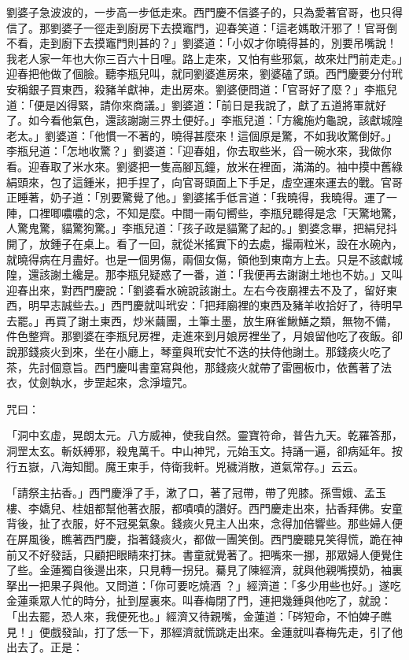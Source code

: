 \begin{showcontents}{}
劉婆子急波波的，一步高一步低走來。西門慶不信婆子的，只為愛著官哥，也只得信了。那劉婆子一徑走到廚房下去摸竈門，迎春笑道：「這老媽敢汗邪了！官哥倒不看，走到廚下去摸竈門則甚的？」劉婆道：「小奴才你曉得甚的，別要吊嘴說！我老人家一年也大你三百六十日哩。路上走來，又怕有些邪氣，故來灶門前走走。」迎春把他做了個臉。聽李瓶兒叫，就同劉婆進房來，劉婆磕了頭。西門慶要分付玳安稱銀子買東西，殺豬羊獻神，走出房來。劉婆便問道：「官哥好了麼？」李瓶兒道：「便是凶得緊，請你來商議。」劉婆道：「前日是我說了，獻了五道將軍就好了。如今看他氣色，還該謝謝三界土便好。」李瓶兒道：「方纔施灼龜說，該獻城隍老太。」劉婆道：「他慣一不著的，曉得甚麼來！這個原是驚，不如我收驚倒好。」李瓶兒道：「怎地收驚？」劉婆道：「迎春姐，你去取些米，舀一碗水來，我做你看。迎春取了米水來。劉婆把一隻高腳瓦鐘，放米在裡面，滿滿的。袖中摸中舊綠絹頭來，包了這鍾米，把手捏了，向官哥頭面上下手足，虛空運來運去的戰。官哥正睡著，奶子道：「別要驚覺了他。」劉婆搖手低言道：「我曉得，我曉得。運了一陣，口裡唧噥噥的念，不知是麼。中間一兩句嚮些，李瓶兒聽得是念「天驚地驚，人驚鬼驚，貓驚狗驚。」李瓶兒道：「孩子政是貓驚了起的。」劉婆念畢，把絹兒抖開了，放鍾子在桌上。看了一回，就從米搖實下的去處，撮兩粒米，設在水碗內，就曉得病在月盡好。也是一個男傷，兩個女傷，領他到東南方上去。只是不該獻城隍，還該謝土纔是。那李瓶兒疑惑了一番，道：「我便再去謝謝土地也不妨。」又叫迎春出來，對西門慶說：「劉婆看水碗說該謝土。左右今夜廟裡去不及了，留好東西，明早志誠些去。」西門慶就叫玳安：「把拜廟裡的東西及豬羊收拾好了，待明早去罷。」再買了謝土東西，炒米繭團，土筆土墨，放生麻雀鰍鱔之類，無物不備，件色整齊。那劉婆在李瓶兒房裡，走進來到月娘房裡坐了，月娘留他吃了夜飯。卻說那錢痰火到來，坐在小廳上，琴童與玳安忙不迭的扶侍他謝土。那錢痰火吃了茶，先討個意旨。西門慶叫書童寫與他，那錢痰火就帶了雷圈板巾，依舊著了法衣，仗劍執水，步罡起來，念淨壇咒。

咒曰：

「洞中玄虛，晃朗太元。八方威神，使我自然。靈寶符命，普告九天。乾羅答那，洞罡太玄。斬妖縛邪，殺鬼萬千。中山神咒，元始玉文。持誦一遍，卻病延年。按行五嶽，八海知聞。魔王柬手，侍衛我軒。兇穢消散，道氣常存。」云云。

「請祭主拈香。」西門慶淨了手，漱了口，著了冠帶，帶了兜膝。孫雪娥、孟玉樓、李嬌兒、桂姐都幫他著衣服，都嘖嘖的讚好。西門慶走出來，拈香拜佛。安童背後，扯了衣服，好不冠冕氣象。錢痰火見主人出來，念得加倍響些。那些婦人便在屏風後，瞧著西門慶，指著錢痰火，都做一團笑倒。西門慶聽見笑得慌，跪在神前又不好發話，只顧把眼睛來打抹。書童就覺著了。把嘴來一挪，那眾婦人便覺住了些。金蓮獨自後邊出來，只見轉一拐兒。驀見了陳經濟，就與他親嘴摸奶，袖裏拏出一把果子與他。又問道：「你可要吃燒酒 ？」經濟道：「多少用些也好。」遂吃金蓮乘眾人忙的時分，扯到屋裏來。叫春梅閉了門，連把幾鍾與他吃了，就說：「出去罷，恐人來，我便死也。」經濟又待親嘴，金蓮道：「硶短命，不怕婢子瞧見！」便戲發訕，打了恁一下，那經濟就慌跳走出來。金蓮就叫春梅先走，引了他出去了。正是：


\end{showcontents}
